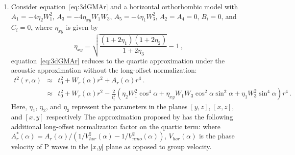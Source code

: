 \begin{enumerate}
\item Consider equation~\ref{eq:3dGMAr} and a horizontal orthorhombic model with $A_1=-4\eta_2W^2_1$, $A_3 = -4 \eta_{xy}W_1 W_3$, $A_5 = -4 \eta_1W_3^2$, $A_2=A_4=0$, $B_i=0$, and $C_i=0$, where $\eta_{xy}$ is given by \cite[]{stovasortho}
\begin{equation}
    \eta_{xy} = \sqrt{\frac{(1+2\eta_1)(1+2\eta_2)}{1+2\eta_3}}-1~,
\end{equation}
equation~\ref{eq:3dGMAr} reduces to the quartic approximation under the acoustic approximation \cite[]{alkaortho} without the long-offset normalization:
\begin{eqnarray}
    t^2(r,\alpha)& \approx & t^2_0 + W_r(\alpha)r^2+A_r(\alpha)  r^4~. \\ \nonumber
     & \approx & t^2_0 + W_r(\alpha)r^2-\frac{2}{t^2_0}\left(\eta_2W^2_1 \cos^4 \alpha+ \eta_{xy}W_1 W_3\cos^2\alpha \sin^2\alpha+\eta_1W_3^2 \sin^4 \alpha\right)r^4~.
\end{eqnarray}
Here, $\eta_1$, $\eta_2$, and $\eta_3$ represent the  parameters in the planes ${[y,z]}$, ${[x,z]}$, and ${[x,y]}$ respectively \cite[]{alkatsvankin,alkaortho,stovasortho} 
The approximation proposed by \cite{alortho} has the following additional long-offset normalization factor on the quartic term:
where $A^*_r (\alpha) = A_r(\alpha)/\left(1/V^2_{hor}(\alpha) -1/V^2_{nmo}(\alpha)\right)$, $V_{hor}(\alpha)$ is the phase velocity of P waves in the [$x$,$y$] plane as opposed to group velocity. 
\end{enumerate}
